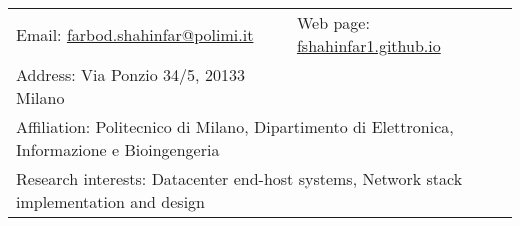 { %
\noindent
\begin{tabular}{p{8cm}l}
    Email: \href{mailto:farbod.shahinfar@polimi.it}{farbod.shahinfar@polimi.it} & 
    Web page: \href{https://fshahinfar1.github.io}{fshahinfar1.github.io} \\
    Address: Via Ponzio 34/5, 20133 Milano &  \\
    \multicolumn{2}{l}{Affiliation: Politecnico di Milano, Dipartimento di Elettronica, Informazione e Bioingengeria} \\
    \multicolumn{2}{l}{Research interests: Datacenter end-host systems, Network stack implementation and design}
\end{tabular}
}
